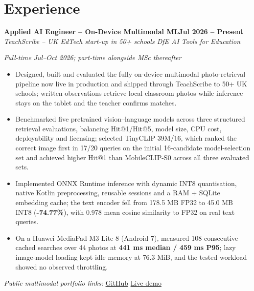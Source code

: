 \documentclass[10pt,a4paper]{article}
\begin{document}
\section{Experience}

%
\textbf{Applied AI Engineer -- On-Device Multimodal ML}\hfill\textbf{Jul 2026 -- Present}\\[-0.08em]
\textit{TeachScribe -- UK EdTech start-up in 50+ schools \textbar{} DfE AI Tools for Education}\par\nopagebreak
\textit{Full-time Jul--Oct 2026; part-time alongside MSc thereafter}\par\nopagebreak
\vspace{0.10em}

\begin{itemize}
  \item Designed, built and evaluated the fully on-device multimodal photo-retrieval pipeline now live in production and shipped through TeachScribe to 50+ UK schools; written observations retrieve local classroom photos while inference stays on the tablet and the teacher confirms matches.
  \item Benchmarked five pretrained vision--language models across three structured retrieval evaluations, balancing Hit@1/Hit@5, model size, CPU cost, deployability and licensing; selected TinyCLIP 39M/16, which ranked the correct image first in 17/20 queries on the initial 16-candidate model-selection set and achieved higher Hit@1 than MobileCLIP-S0 across all three evaluated sets.
  \item Implemented ONNX Runtime inference with dynamic INT8 quantisation, native Kotlin preprocessing, reusable sessions and a RAM + SQLite embedding cache; the text encoder fell from 178.5 MB FP32 to 45.0 MB INT8 (\textbf{-74.77\%}), with 0.978 mean cosine similarity to FP32 on real text queries.
  \item On a Huawei MediaPad M3 Lite 8 (Android 7), measured 108 consecutive cached searches over 44 photos at \textbf{441 ms median / 459 ms P95}; lazy image-model loading kept idle memory at 76.3 MiB, and the tested workload showed no observed throttling.
\end{itemize}

\textit{Public multimodal portfolio links:} \href{https://github.com/albertoreyescastro/public-multimodal-retrieval-demo}{GitHub} \textbar{} \href{https://albertoreyescastro.github.io/public-multimodal-retrieval-demo/}{Live demo}\par
\end{document}
